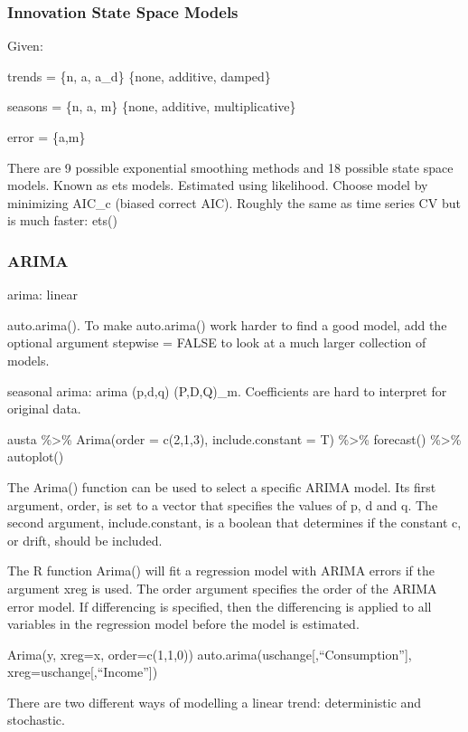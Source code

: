 \documentclass[]{book}
\begin{document}
\hypertarget{innovation-state-space-models}{%
\subsubsection{Innovation State Space Models}\label{innovation-state-space-models}}

Given:

trends = \{n, a, a\_d\} \{none, additive, damped\}

seasons = \{n, a, m\} \{none, additive, multiplicative\}

error = \{a,m\}

There are 9 possible exponential smoothing methods and 18 possible state space models. Known as ets models. Estimated using likelihood. Choose model by minimizing AIC\_c (biased correct AIC). Roughly the same as time series CV but is much faster: ets()

\hypertarget{arima}{%
\subsubsection{ARIMA}\label{arima}}

arima: linear

auto.arima(). To make auto.arima() work harder to find a good model, add the optional argument stepwise = FALSE to look at a much larger collection of models.

seasonal arima: arima (p,d,q) (P,D,Q)\_m. Coefficients are hard to interpret for original data.

austa \%\textgreater{}\% Arima(order = c(2,1,3), include.constant = T) \%\textgreater{}\% forecast() \%\textgreater{}\% autoplot()

The Arima() function can be used to select a specific ARIMA model. Its first argument, order, is set to a vector that specifies the values of p, d and q. The second argument, include.constant, is a boolean that determines if the constant c, or drift, should be included.

The R function Arima() will fit a regression model with ARIMA errors if the argument xreg is used. The order argument specifies the order of the ARIMA error model. If differencing is specified, then the differencing is applied to all variables in the regression model before the model is estimated.

Arima(y, xreg=x, order=c(1,1,0)) auto.arima(uschange{[},``Consumption''{]}, xreg=uschange{[},``Income''{]})

There are two different ways of modelling a linear trend: deterministic and stochastic.
\end{document}
